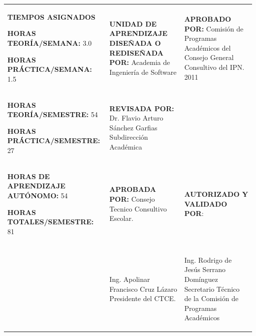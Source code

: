 \documentclass[10pt]{article}
\begin{document}
\begin{table}[H]
  \begin{tabular}{|p{}|p{}|p{}|}
    \hline
    \centering
    \textbf{TIEMPOS ASIGNADOS}

    \raggedright
    \textbf{HORAS TEORÍA/SEMANA:} 3.0

    \textbf{HORAS PRÁCTICA/SEMANA:} 1.5
    & 
    \textbf{UNIDAD DE APRENDIZAJE DISEÑADA O REDISEÑADA POR: } Academia de Ingeniería de Software 
    &
    \textbf{APROBADO POR:} Comisión de Programas Académicos del Consejo General Consultivo del IPN. 2011
    
    \\
    \textbf{HORAS TEORÍA/SEMESTRE:} 54
    \raggedright
    \textbf{HORAS PRÁCTICA/SEMESTRE:} 27
    & 
    \textbf{REVISADA POR:} Dr. Flavio Arturo Sánchez Garfias Subdirección Académica
    &\\ 
    \textbf{HORAS DE APRENDIZAJE AUTÓNOMO:} 54

    \textbf{HORAS TOTALES/SEMESTRE:} 81
    & 
    \textbf{APROBADA POR:} Consejo Tecnico Consultivo Escolar.
     & 
    \textbf{AUTORIZADO Y VALIDADO POR}:\\& &\\ & \hline
    \begin{center}Ing. Apolinar Francisco Cruz Lázaro Presidente del CTCE.\end{center} & \hline

    \begin{center}Ing. Rodrigo de Jesús Serrano Domínguez
 Secretario Técnico de la Comisión de Programas Académicos\end{center}\\ 
    \hline
  \end{tabular}
\end{table}

\end{document}
